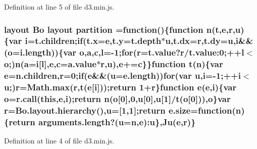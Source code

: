Definition at line 5 of file d3.\+min.\+js.

\subsubsection[{partition}]{ {\bf layout} {\bf Bo} {\bf layout} partition =function()\{function {\bf n}(t,{\bf e},{\bf r},u)\{var {\bf i}=t.\+children;{\bf if}({\bf t.\+x}={\bf e},t.\+y=t.\+depth$\ast$u,t.\+dx={\bf r},t.\+dy=u,{\bf i}\&\&({\bf o}=i.\+length))\{var {\bf o},{\bf a},{\bf c},l=-\/1;{\bf for}({\bf r}=t.\+value?{\bf r}/t.\+value\+:0;++l$<${\bf o};){\bf n}({\bf a}={\bf i}[l],{\bf e},{\bf c}=a.\+value$\ast${\bf r},u),{\bf e}+={\bf c}\}\}function t({\bf n})\{var {\bf e}=n.\+children,{\bf r}=0;{\bf if}({\bf e}\&\&(u=e.\+length)){\bf for}(var u,{\bf i}=-\/1;++{\bf i}$<$u;){\bf r}={\bf Math.\+max}({\bf r},t({\bf e}[{\bf i}]));{\bf return} 1+{\bf r}\}function {\bf e}({\bf e},{\bf i})\{var {\bf o}={\bf r.\+call}({\bf this},{\bf e},{\bf i});{\bf return} {\bf n}({\bf o}[0],0,u[0],u[1]/t({\bf o}[0])),{\bf o}\}var {\bf r}={\bf Bo.\+layout.\+hierarchy}(),u=[1,1];{\bf return} {\bf e.\+size}=function({\bf n})\{{\bf return} arguments.\+length?(u={\bf n},{\bf e})\+:u\},{\bf Ju}({\bf e},{\bf r})\}}\label{d3_8min_8js_a0cb5016efb07767a65c7e16d4ca7f91a}


Definition at line 4 of file d3.\+min.\+js.


